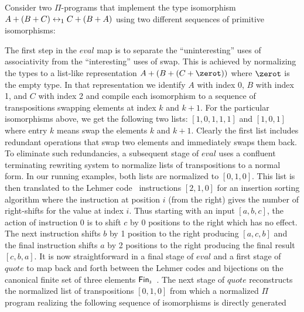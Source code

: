 Consider two $\Pi$-programs that implement the type isomorphism {\small
  $A + (B + C) \leftrightarrow_1 C + (B + A)$} using two different sequences of primitive
isomorphisms:

\medskip

{}

\medskip\noindent The first step in the $\mathit{eval}$ map is to separate the
``uninteresting'' uses of associativity from the ``interesting'' uses of
swap. This is achieved by normalizing the types to a list-like representation
$A + (B + (C + \zerot))$ where $\zerot$ is the empty type. In that
representation we identify $A$ with index 0, $B$ with index 1, and $C$ with
index 2 and compile each isomorphism to a sequence of transpositions swapping
elements at index $k$ and $k+1$. For the particular isomorphisms above, we get
the following two lists: $[1,0,1,1,1]$ and $[1,0,1]$ where entry $k$ means swap
the elements $k$ and $k+1$. Clearly the first list includes redundant operations
that swap two elements and immediately swaps them back. To eliminate such
redundancies, a subsequent stage of $\mathit{eval}$ uses a confluent terminating
rewriting system to normalize lists of transpositions to a normal form. In our
running examples, both lists are normalized to $[0,1,0]$. This list is then
translated to the Lehmer code~\cite{lehmerTeachingCombinatorialTricks1960}
instructions $[2,1,0]$ for an insertion sorting algorithm where the instruction
at position $i$ (from the right) gives the number of right-shifts for the value
at index $i$. Thus starting with an input $[a,b,c]$, the action of instruction
$0$ is to shift $c$ by 0 positions to the right which has no effect. The next
instruction shifts $b$ by 1 position to the right producing $[a,c,b]$ and the
final instruction shifts $a$ by 2 positions to the right producing the final
result $[c,b,a]$. It is now straightforward in a final stage of $\mathit{eval}$
and a first stage of $\mathit{quote}$ to map back and forth between the Lehmer
codes and bijections on the canonical finite set of three elements
$\Fin[3]$~\citet{Molzer-cubical}. The next stage of $\mathit{quote}$
reconstructs the normalized list of transpositions $[0,1,0]$ from which a
normalized $\Pi$ program realizing the following sequence of isomorphisms is
directly generated {\scalebox{\scalef}{$%
    A + (B + (C + \zerot)) \isoone B + (A + (C + \zerot)) \isoone B + (C + (A +
    \zerot)) \isoone C + (B + (A + \zerot)).  $}}

